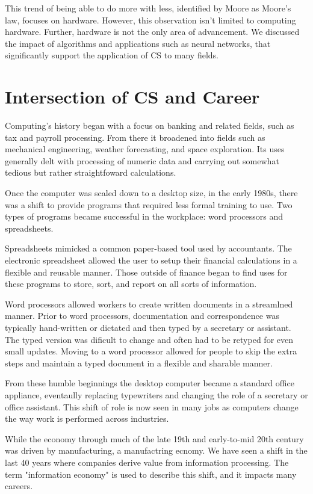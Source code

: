 This trend of being able to do more with less, identified by Moore as Moore's law, focuses on hardware. However, this observation isn't limited to computing hardware. Further, hardware is not the only area of advancement. We discussed the impact of algorithms and applications such as neural networks, that significantly support the application of CS to many fields.


\section{Intersection of CS and Career}

Computing's history began with a focus on banking and related fields, such as tax and payroll processing. From there it broadened into fields such as mechanical engineering, weather forecasting, and space exploration. Its uses generally delt with processing of numeric data and carrying out somewhat tedious but rather straightfoward calculations.

Once the computer was scaled down to a desktop size, in the early 1980s, there was a shift to provide programs that required less formal training to use. Two types of programs became successful in the workplace: word processors and spreadsheets.

Spreadsheets mimicked a common paper-based tool used by accountants. The electronic spreadsheet allowed the user to setup their financial calculations in a flexible and reusable manner. Those outside of finance began to find uses for these programs to store, sort, and report on all sorts of information.

Word processors allowed workers to create written documents in a streamlned manner. Prior to word processors, documentation and correspondence was typically hand-written or dictated and then typed by a secretary or assistant. The typed version was dificult to change and often had to be retyped for even small updates. Moving to a word processor allowed for people to skip the extra steps and maintain a typed document in a flexible and sharable manner.

From these humble beginnings the desktop computer became a standard office appliance, eventaully replacing typewriters and changing the role of a secretary or office assistant. This shift of role is now seen in many jobs as computers change the way work is performed across industries.

While the economy through much of the late 19th and early-to-mid 20th century was driven by manufacturing, a manufactring ecnomy. We have seen a shift in the last 40 years where companies derive value from information processing. The term "information economy" is used to describe this shift, and it impacts many careers. 


